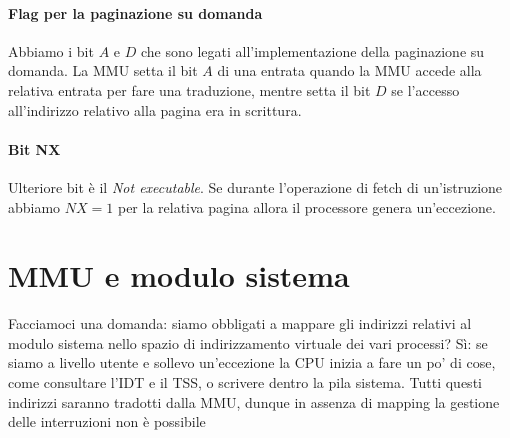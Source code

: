 \paragraph{Flag per la paginazione su domanda} Abbiamo i bit $A$ e $D$ che sono legati all'implementazione della paginazione su domanda. La MMU setta il bit $A$ di una entrata quando la MMU accede alla relativa entrata per fare una traduzione, mentre setta il bit $D$ se l'accesso all'indirizzo relativo alla pagina era in scrittura.
\paragraph{Bit NX} Ulteriore bit è il \emph{Not executable}. Se durante l'operazione di fetch di un'istruzione abbiamo $NX=1$ per la relativa pagina allora il processore genera un'eccezione.







\section{MMU e modulo sistema} 
Facciamoci una domanda: siamo obbligati a mappare gli indirizzi relativi al modulo sistema nello spazio di indirizzamento virtuale dei vari processi? Sì: se siamo a livello utente e sollevo un'eccezione la CPU inizia a fare un po' di cose, come consultare l'IDT e il TSS, o scrivere dentro la pila sistema. Tutti questi indirizzi saranno tradotti dalla MMU, dunque in assenza di mapping la gestione delle interruzioni non è possibile

